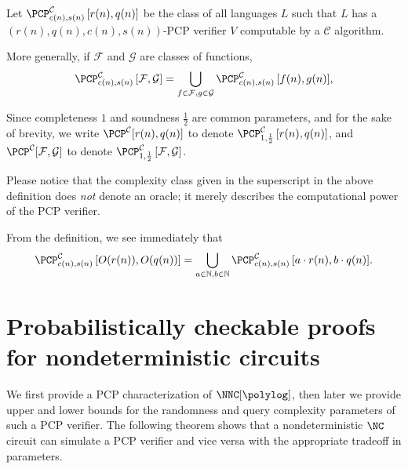 \begin{definition}
  Let $\PCPcs{\mathcal{C}}{c(n)}{s(n)}{r(n)}{q(n)}$ be the class of all languages $L$ such that $L$ has a $(r(n), q(n), c(n), s(n))$-PCP verifier $V$ computable by a $\mathcal{C}$ algorithm.

  More generally, if $\mathcal{F}$ and $\mathcal{G}$ are classes of functions,
  \begin{equation*}
    \PCPcs{\mathcal{C}}{c(n)}{s(n)}{\mathcal{F}}{\mathcal{G}} = \bigcup_{f \in \mathcal{F}, g \in \mathcal{G}}{\PCPcs{\mathcal{C}}{c(n)}{s(n)}{f(n)}{g(n)}},
    \end{equation*}

  Since completeness $1$ and soundness $\frac{1}{2}$ are common parameters, and for the sake of brevity, we write $\PCP^{\mathcal{C}}[r(n), q(n)]$ to denote $\PCPcs{\mathcal{C}}{1}{\frac{1}{2}}{r(n)}{q(n)}$, and $\PCP^{\mathcal{C}}[\mathcal{F}, \mathcal{G}]$ to denote $\PCPcs{\mathcal{C}}{1}{\frac{1}{2}}{\mathcal{F}}{\mathcal{G}}$.
\end{definition}

Please notice that the complexity class given in the superscript in the above definition does \emph{not} denote an oracle; it merely describes the computational power of the PCP verifier.

From the definition, we see immediately that
\begin{equation*}
  \PCPcs{\mathcal{C}}{c(n)}{s(n)}{O(r(n))}{O(q(n))} = \bigcup_{a \in \mathbb{N}, b \in \mathbb{N}}{\PCPcs{\mathcal{C}}{c(n)}{s(n)}{a \cdot r(n)}{b \cdot q(n)}}.
\end{equation*}

\section{Probabilistically checkable proofs for nondeterministic circuits}

We first provide a PCP characterization of $\NNC[\polylog]$, then later we provide upper and lower bounds for the randomness and query complexity parameters of such a PCP verifier.
The following theorem shows that a nondeterministic $\NC$ circuit can simulate a PCP verifier and vice versa with the appropriate tradeoff in parameters.

